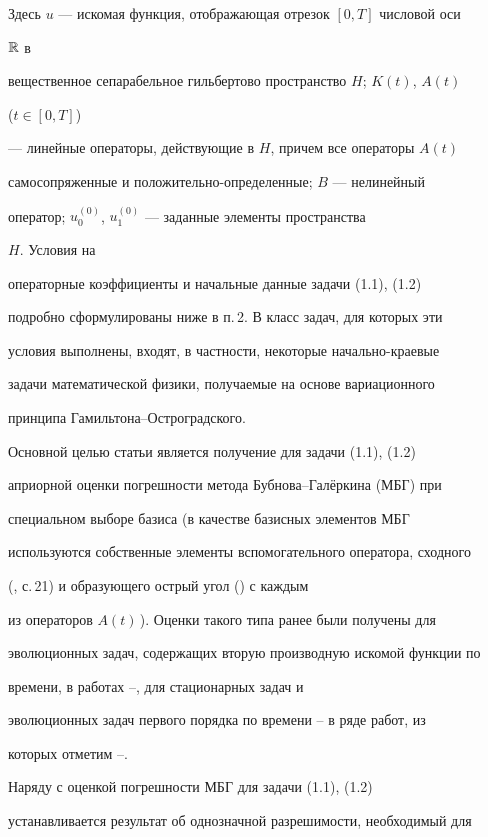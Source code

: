 Здесь $u$ --- искомая функция, отображающая отрезок $[0,T]$ числовой оси 


$\Bbb R$ в 


вещественное сепарабельное гильбертово пространство $H$; $K(t)$, $A(t)$ 


($t\in[0,T]$) 


--- линейные операторы, действующие в $H$, причем все операторы $A(t)$ 


самосопряженные и положительно-определенные; $B$ --- нелинейный 


оператор; $u^{(0)}_0$, $u^{(0)}_1$ --- заданные элементы пространства 


$H$. Условия на 


операторные коэффициенты и начальные данные задачи (1.1), (1.2) 


подробно сформулированы ниже в п.\,2. В класс задач, для которых эти 


условия выполнены, входят, в частности, некоторые начально-краевые 


задачи математической физики, получаемые на основе вариационного 


принципа Гамильтона--Остроградского. 


 


Основной целью статьи является получение для задачи (1.1), (1.2)  


априорной оценки погрешности метода Бубнова--Гал\"еркина (МБГ) при 


специальном выборе базиса (в качестве базисных элементов МБГ 


используются собственные элементы вспомогательного оператора, сходного 


(\cite{1}, с.\,21) и образующего острый угол (\cite{2}) с каждым 


из операторов $A(t)$\,). Оценки такого типа ранее были получены для 


эволюционных задач, содержащих вторую производную искомой функции по 


времени, в работах \cite{3}--\cite{5}, для стационарных задач и 


эволюционных задач первого порядка по времени -- в ряде работ, из 


которых отметим \cite{6}--\cite{9}. 


 


Наряду с оценкой погрешности МБГ для задачи (1.1), (1.2) 


устанавливается результат об однозначной разрешимости, необходимый для 


